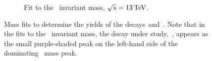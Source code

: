 \begin{figure}[p]
\begin{subfigure}{.48\textwidth}
        \caption{Fit to the \DsmpPpm~invariant mass, \({\sqs = \SI{13}{\TeV}}\).}
    \end{subfigure}
    \caption{
        Mass fits to determine the yields of the decays~\BdDsPi and~\LbDsP.
        Note that in the fits to the \DspmPimp~invariant mass, the decay under study,~\BdDsPi, appears as the small purple-shaded peak on the left-hand side of the dominating \BsDsPi~mass peak.}
    \label{fig:Vub_MassFits}
\end{figure}

